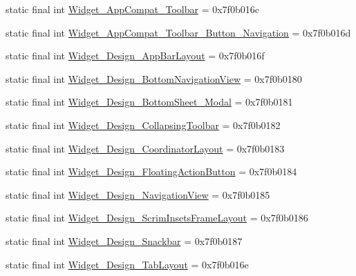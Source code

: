 \begin{CompactItemize}
\item 
static final int \hyperlink{classandroid_1_1support_1_1v7_1_1mediarouter_1_1_r_1_1style_a1fd19ef4d8961e38f7708654646fe16}{Widget\_\-AppCompat\_\-Toolbar} = 0x7f0b016c
\item 
static final int \hyperlink{classandroid_1_1support_1_1v7_1_1mediarouter_1_1_r_1_1style_58b1806c5cc614eb21630e514e8b89c4}{Widget\_\-AppCompat\_\-Toolbar\_\-Button\_\-Navigation} = 0x7f0b016d
\item 
static final int \hyperlink{classandroid_1_1support_1_1v7_1_1mediarouter_1_1_r_1_1style_80888d4c6fc50af02d3470ddcc8cc8ac}{Widget\_\-Design\_\-AppBarLayout} = 0x7f0b016f
\item 
static final int \hyperlink{classandroid_1_1support_1_1v7_1_1mediarouter_1_1_r_1_1style_b39e104625f7bcb4f26ab3b334008e82}{Widget\_\-Design\_\-BottomNavigationView} = 0x7f0b0180
\item 
static final int \hyperlink{classandroid_1_1support_1_1v7_1_1mediarouter_1_1_r_1_1style_97d6ed6ba40570f3a9166401d83ad41a}{Widget\_\-Design\_\-BottomSheet\_\-Modal} = 0x7f0b0181
\item 
static final int \hyperlink{classandroid_1_1support_1_1v7_1_1mediarouter_1_1_r_1_1style_a88b1b0b665b5e21ee63ae81ba1c743a}{Widget\_\-Design\_\-CollapsingToolbar} = 0x7f0b0182
\item 
static final int \hyperlink{classandroid_1_1support_1_1v7_1_1mediarouter_1_1_r_1_1style_b3d4f7994a3e85febacd1e5a1383b47f}{Widget\_\-Design\_\-CoordinatorLayout} = 0x7f0b0183
\item 
static final int \hyperlink{classandroid_1_1support_1_1v7_1_1mediarouter_1_1_r_1_1style_2261a2c6ec3fd9a305b4573abe879a22}{Widget\_\-Design\_\-FloatingActionButton} = 0x7f0b0184
\item 
static final int \hyperlink{classandroid_1_1support_1_1v7_1_1mediarouter_1_1_r_1_1style_6c985a333e4ebe0510840c856f8502ec}{Widget\_\-Design\_\-NavigationView} = 0x7f0b0185
\item 
static final int \hyperlink{classandroid_1_1support_1_1v7_1_1mediarouter_1_1_r_1_1style_8e451f51f87510b924aaa9539b107e67}{Widget\_\-Design\_\-ScrimInsetsFrameLayout} = 0x7f0b0186
\item 
static final int \hyperlink{classandroid_1_1support_1_1v7_1_1mediarouter_1_1_r_1_1style_e3a4974208cb80d99c9fac56891e586a}{Widget\_\-Design\_\-Snackbar} = 0x7f0b0187
\item 
static final int \hyperlink{classandroid_1_1support_1_1v7_1_1mediarouter_1_1_r_1_1style_1991b0e12025a4bcc7cc325dbe076de4}{Widget\_\-Design\_\-TabLayout} = 0x7f0b016e

\end{CompactItemize}
